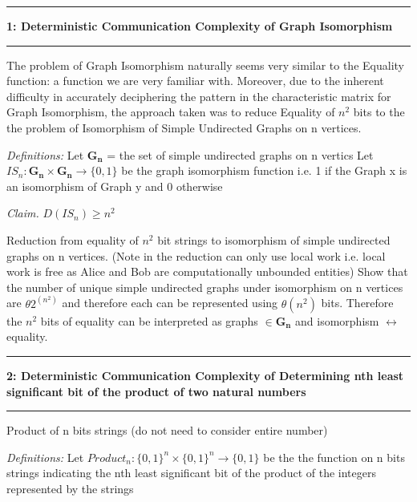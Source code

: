\documentclass[11pt]{article}
\newcommand\question[2]{\vspace{.25in}\hrule\textbf{#1: #2}\vspace{.5em}\hrule\vspace{.10in}}
\newcommand\definitions{\emph{Definitions:}\newline}
\newcommand\claim{\emph{Claim.}\newline}
\begin{document}
\raggedright
\newcommand\NAME{Siddharth Joshi}  %
\newcommand\HWNUM{}              %


\question{1}{Deterministic Communication Complexity of Graph Isomorphism} 

The problem of Graph Isomorphism naturally seems very similar to the Equality function: a function we are very familiar with. Moreover, due to the inherent difficulty in accurately deciphering the pattern in the characteristic matrix for Graph Isomorphism, the approach taken was to reduce Equality of $n^2$ bits to the the problem of Isomorphism of Simple Undirected Graphs on n vertices. \newline

\definitions
Let $\mathbf{G_n}$ = the set of simple undirected graphs on n vertics \newline
Let $IS_n: \mathbf{G_n} \times \mathbf{G_n} \to \{0, 1\}$ be the graph isomorphism function i.e. 1 if the Graph x is an isomorphism of Graph y and 0 otherwise
\newline

\claim
$ D(IS_n) \geq n^2 $

\proof 
Reduction from equality of $n^2$ bit strings to isomorphism of simple undirected graphs on n vertices. (Note in the reduction can only use local work i.e. local work is free as Alice and Bob are computationally unbounded entities) \newline
Show that the number of unique simple undirected graphs under isomorphism on n vertices are $\theta2^{(n^2)}$ and therefore each can be represented using $\theta(n^2)$ bits. Therefore the $n^2$ bits of equality can be interpreted as graphs $\in \mathbf{G_n}$ and isomorphism $\leftrightarrow$ equality.
\newpage

\question{2}{Deterministic Communication Complexity of Determining nth least significant bit of the product of two natural numbers} 

Product of n bits strings (do not need to consider entire number)

\definitions
Let $Product_n: {\{0, 1\}}^n \times {\{0, 1\}}^n \to \{0, 1\}$ be the the function on n bits strings indicating the nth least significant bit of the product of the integers represented by the strings
\end{document}
